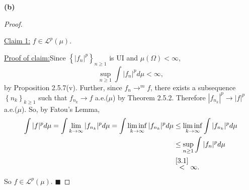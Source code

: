\documentclass[12pt]{article}
\newenvironment{claimproof}[1]{\par\noindent\underline{Proof of claim:}\space#1}{\hfill $\blacksquare$\vspace{3mm}}
\begin{document}
\vspace{5mm}
{\bf (b)}
\begin{proof}
$\ $

\underline{Claim 1:} $f \in \mathcal{L}^{p}(\mu)$.
\begin{claimproof}
Since $\left\{ |f_{n}|^{p} \right\}_{n\geq 1}$ is UI and $\mu(\Omega) < \infty$,
\begin{equation}
\sup_{n\geq 1}\int |f_{n}|^{p}d\mu < \infty,
\label{3.1}
\end{equation}
by Proposition 2.5.7(v). Further, since $f_{n} \rightarrow^{m} f$, there exists a subsequence $\left\{ n_{k} \right\}_{k\geq 1}$ such that $f_{n_{k}}
\rightarrow f$ a.e.($\mu$) by Theorem 2.5.2. Therefore $|f_{n_{k}}|^{p} \rightarrow |f|^{p}$ a.e.($\mu$). So, by Fatou's Lemma,
\begin{align*} \int |f|^{p} d\mu = \int \lim_{k\rightarrow\infty}|f_{n_k}|^{p}d\mu = \int \liminf_{k\rightarrow\infty} |f_{n_{k}}|^{p}d\mu & \leq
\liminf_{k\rightarrow\infty} \int |f_{n_{k}}|^{p}d\mu \\
& \leq \sup_{n\geq 1}\int |f_{n}|^{p}d\mu \\
& \stackrel{\eqref{3.1}}{<}\infty.
\end{align*}
So $f \in \mathcal{L}^{p}(\mu)$.
\end{claimproof}


\end{proof}
\end{document}
